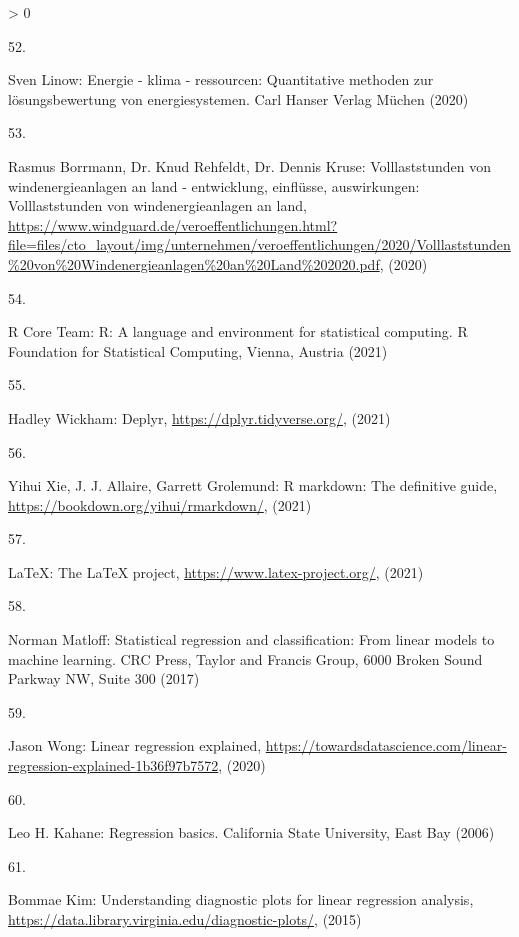 \documentclass[a4paper,11pt]{article}
\newlength{\cslhangindent}
\newlength{\csllabelwidth}
\newenvironment{CSLReferences}[3] %
 {%
  \setlength{\parindent}{0pt}
  \ifodd #1 \everypar{\setlength{\hangindent}{\cslhangindent}}\ignorespaces\fi
  \ifnum #2 > 0
  \setlength{\parskip}{#2\baselineskip}
  \fi
 }%
 {}
\newcommand{\CSLLeftMargin}[1]{\parbox[t]{\maxof{\widthof{#1}}{\csllabelwidth}}{#1}}
\newcommand{\CSLRightInline}[1]{\parbox[t]{\linewidth}{#1}}
\begin{document}
\begin{CSLReferences}{0}{0}
\leavevmode\hypertarget{ref-SvenLinow.2020}{}%
\CSLLeftMargin{52. }
\CSLRightInline{Sven Linow: Energie - klima - ressourcen: Quantitative methoden zur l{ö}sungsbewertung von energiesystemen. {Carl Hanser Verlag M{ü}chen} (2020)}

\leavevmode\hypertarget{ref-RasmusBorrmannDr.KnudRehfeldtDr.DennisKruse.2020}{}%
\CSLLeftMargin{53. }
\CSLRightInline{Rasmus Borrmann, Dr. Knud Rehfeldt, Dr. Dennis Kruse: Volllaststunden von windenergieanlagen an land - entwicklung, einfl{ü}sse, auswirkungen: Volllaststunden von windenergieanlagen an land, \url{https://www.windguard.de/veroeffentlichungen.html?file=files/cto_layout/img/unternehmen/veroeffentlichungen/2020/Volllaststunden\%20von\%20Windenergieanlagen\%20an\%20Land\%202020.pdf}, (2020)}

\leavevmode\hypertarget{ref-R}{}%
\CSLLeftMargin{54. }
\CSLRightInline{R Core Team: R: A language and environment for statistical computing. R Foundation for Statistical Computing, Vienna, Austria (2021)}

\leavevmode\hypertarget{ref-HadleyWickham.2021}{}%
\CSLLeftMargin{55. }
\CSLRightInline{Hadley Wickham: Deplyr, \url{https://dplyr.tidyverse.org/}, (2021)}

\leavevmode\hypertarget{ref-YihuiXieJ.J.AllaireGarrettGrolemund.2021}{}%
\CSLLeftMargin{56. }
\CSLRightInline{Yihui Xie, J. J. Allaire, Garrett Grolemund: R markdown: The definitive guide, \url{https://bookdown.org/yihui/rmarkdown/}, (2021)}

\leavevmode\hypertarget{ref-LaTeX.2021}{}%
\CSLLeftMargin{57. }
\CSLRightInline{LaTeX: The LaTeX project, \url{https://www.latex-project.org/}, (2021)}

\leavevmode\hypertarget{ref-NormanMatloff.2017}{}%
\CSLLeftMargin{58. }
\CSLRightInline{Norman Matloff: Statistical regression and classification: From linear models to machine learning. {CRC Press, Taylor and Francis Group}, 6000 Broken Sound Parkway NW, Suite 300 (2017)}

\leavevmode\hypertarget{ref-JasonWong.2020}{}%
\CSLLeftMargin{59. }
\CSLRightInline{Jason Wong: Linear regression explained, \url{https://towardsdatascience.com/linear-regression-explained-1b36f97b7572}, (2020)}

\leavevmode\hypertarget{ref-LeoH.Kahane.2006}{}%
\CSLLeftMargin{60. }
\CSLRightInline{Leo H. Kahane: Regression basics. {California State University, East Bay} (2006)}

\leavevmode\hypertarget{ref-BommaeKim.2015}{}%
\CSLLeftMargin{61. }
\CSLRightInline{Bommae Kim: Understanding diagnostic plots for linear regression analysis, \url{https://data.library.virginia.edu/diagnostic-plots/}, (2015)}


\end{CSLReferences}
\end{document}
